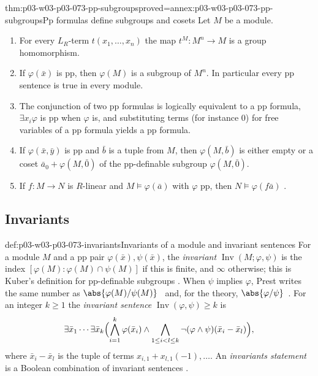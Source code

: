 \begin{hblemma}{thm:p03-w03-p03-073-pp-subgroups}{proved=annex:p03-w03-p03-073-pp-subgroups}{Pp formulas define subgroups and cosets}
Let \(M\) be a module.
\begin{enumerate}
\item For every \(L_R\)-term \(t(x_1,\ldots,x_n)\) the map
      \(t^M:M^n\to M\) is a group homomorphism.
\item If \(\varphi(\bar x)\) is pp, then \(\varphi(M)\) is a subgroup of
      \(M^n\). In particular every pp sentence is true in every module.
\item The conjunction of two pp formulas is logically equivalent to a pp
      formula, \(\exists x_i\varphi\) is pp when \(\varphi\) is, and
      substituting terms (for instance \(0\)) for free variables of a pp
      formula yields a pp formula.
\item If \(\varphi(\bar x,\bar y)\) is pp and \(\bar b\) is a tuple from
      \(M\), then \(\varphi(M,\bar b)\) is either empty or a coset
      \(\bar a_0+\varphi(M,\bar 0)\) of the pp-definable subgroup
      \(\varphi(M,\bar 0)\).
\item If \(f:M\to N\) is \(R\)-linear and \(M\models\varphi(\bar a)\)
      with \(\varphi\) pp, then \(N\models\varphi(f\bar a)\)
      \cite[Lemma~3.1]{Prest2020ModelTheoryModules}.
\end{enumerate}
\end{hblemma}

\subsection{Invariants}
\label{sec:p03-w03-p03-073-invariants}

\begin{hbdefinition}{def:p03-w03-p03-073-invariants}{Invariants of a module and invariant sentences}
For a module \(M\) and a pp pair \(\varphi(\bar x),\psi(\bar x)\), the
\emph{invariant} \(\operatorname{Inv}(M;\varphi,\psi)\) is the index
\([\varphi(M):\varphi(M)\cap\psi(M)]\) if this is finite, and \(\infty\)
otherwise; this is Kuber's definition for pp-definable subgroups
\cite[Definition~2.5.4]{Kuber2013GrothendieckModules}. When \(\psi\)
implies \(\varphi\), Prest writes the same number as
\(\abs{\varphi(M)/\psi(M)}\)~\cite[\S3]{Prest2020ModelTheoryModules} and,
for the theory, \(\abs{\varphi/\psi}\)~\cite[\S7]{Prest2020ModelTheoryModules}. For an integer
\(k\ge1\) the \emph{invariant sentence} \(\operatorname{Inv}(\varphi,\psi)\ge k\)
is
\[
 \exists\bar x_1\cdots\exists\bar x_k\Bigl(\bigwedge_{i=1}^k\varphi(\bar x_i)
 \wedge\bigwedge_{1\le i<l\le k}\neg(\varphi\wedge\psi)(\bar x_i-\bar x_l)\Bigr),
\]
where \(\bar x_i-\bar x_l\) is the tuple of terms
\(x_{i,1}+x_{l,1}(-1),\ldots\). An \emph{invariants statement} is a
Boolean combination of invariant sentences
\cite[\S3]{Prest2020ModelTheoryModules}.
\end{hbdefinition}

